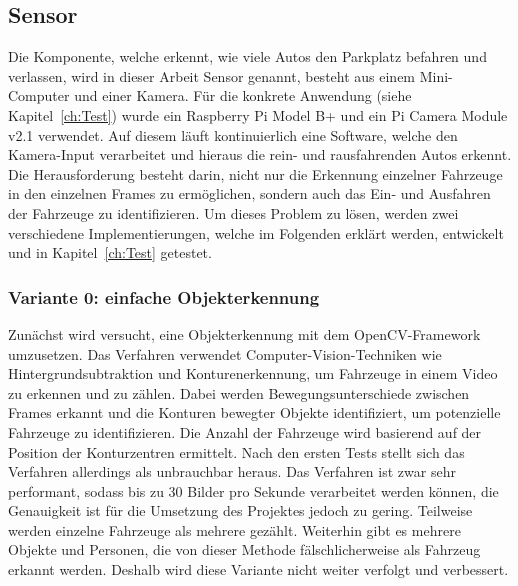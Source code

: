 \subsection{Sensor}\label{ch:Umsetzung_Sensor}

Die Komponente, welche erkennt, wie viele Autos den Parkplatz befahren und verlassen, wird in dieser Arbeit Sensor genannt, besteht aus einem Mini-Computer und einer Kamera.
Für die konkrete Anwendung (siehe Kapitel~\ref{ch:Test}) wurde ein Raspberry Pi Model B+ und ein Pi Camera Module v2.1 verwendet.
Auf diesem läuft kontinuierlich eine Software, welche den Kamera-Input verarbeitet und hieraus die rein- und rausfahrenden Autos erkennt.
Die Herausforderung besteht darin, nicht nur die Erkennung einzelner Fahrzeuge in den einzelnen Frames zu ermöglichen, sondern auch das Ein- und Ausfahren der Fahrzeuge zu identifizieren.
Um dieses Problem zu lösen, werden zwei verschiedene Implementierungen, welche im Folgenden erklärt werden, entwickelt und in Kapitel~\ref{ch:Test} getestet.

\subsubsection{Variante 0: einfache Objekterkennung}\label{ch:Sensor_v0}
Zunächst wird versucht, eine Objekterkennung mit dem OpenCV-Framework umzusetzen.
Das Verfahren verwendet Computer-Vision-Techniken wie Hintergrundsubtraktion und Konturen\-erkennung, um Fahrzeuge in einem Video zu erkennen und zu zählen.
Dabei werden Bewegungsunterschiede zwischen Frames erkannt und die Konturen bewegter Objekte identifiziert, um potenzielle Fahrzeuge zu identifizieren.
Die Anzahl der Fahrzeuge wird basierend auf der Position der Konturzentren ermittelt.
Nach den ersten Tests stellt sich das Verfahren allerdings als unbrauchbar heraus.
Das Verfahren ist zwar sehr performant, sodass bis zu 30 Bilder pro Sekunde verarbeitet werden können, die Genauigkeit ist für die Umsetzung des Projektes jedoch zu gering.
Teilweise werden einzelne Fahrzeuge als mehrere gezählt.
Weiterhin gibt es mehrere Objekte und Personen, die von dieser Methode fälschlicherweise als Fahrzeug erkannt werden.
Deshalb wird diese Variante nicht weiter verfolgt und verbessert.

